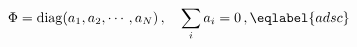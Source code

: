 \begin{equation}
\Phi={\rm diag} (a_1,a_2,\cdots,a_N)\,,\quad \sum_i a_i=0\,,
\eqlabel{adsc}
\end{equation}

